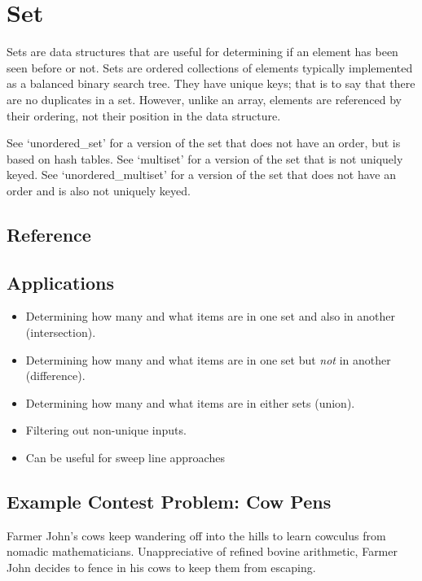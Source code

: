 \section{Set}
Sets are data structures that are useful for determining if an element has been seen before or not.
Sets are ordered collections of elements typically implemented as a balanced binary search tree.
They have unique keys; that is to say that there are no duplicates in a set.
However, unlike an array, elements are referenced by their ordering, not their position in the data structure.

See `unordered\_set' for a version of the set that does not have an order, but is based on hash tables.
See `multiset' for a version of the set that is not uniquely keyed.
See `unordered\_multiset' for a version of the set that does not have an order and is also not uniquely keyed.

\subsection{Reference}

\subsection{Applications}

\begin{itemize}
	\item Determining how many and what items are in one set and also in another (intersection).
	\item Determining how many and what items are in one set but \emph{not} in another (difference).
	\item Determining how many and what items are in either sets (union).
	\item Filtering out non-unique inputs.
    \item Can be useful for sweep line approaches
\end{itemize}

\subsection{Example Contest Problem: Cow Pens}
Farmer John's cows keep wandering off into the hills to learn cowculus from nomadic mathematicians.
Unappreciative of refined bovine arithmetic, Farmer John decides to fence in his cows to keep them from escaping.

